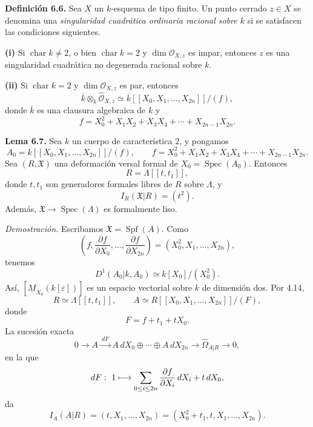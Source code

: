 
\par\medskip
\noindent\textbf{Definición 6.6.}
Sea $X$ un $k$-esquema de tipo finito. Un punto cerrado $z\in X$ se
denomina una \emph{singularidad cuadrática ordinaria racional sobre
$k$} si se satisfacen las condiciones siguientes.

\smallskip
\noindent\textbf{(i)} Si $\operatorname{char}k\neq2$, o bien
$\operatorname{char}k=2$ y $\dim\mathcal O_{X,z}$ es impar, entonces
$z$ es una singularidad cuadrática no degenerada racional sobre $k$.

\smallskip
\noindent\textbf{(ii)} Si $\operatorname{char}k=2$ y
$\dim\mathcal O_{X,z}$ es par, entonces
\[
\overline k\otimes_k\widehat{\mathcal O}_{X,z}
 \simeq
\overline k[[X_0,X_1,\ldots,X_{2n}]]/(f),
\]
donde $\overline k$ es una clausura algebraica de $k$ y
\[
f=X_0^2+X_1X_2+X_3X_4+\cdots+X_{2n-1}X_{2n}.
\]

\par\medskip
\noindent\textbf{Lema 6.7.}
Sea $k$ un cuerpo de característica $2$, y pongamos
\[
A_0=k[[X_0,X_1,\ldots,X_{2n}]]/(f),
\qquad
f=X_0^2+X_1X_2+X_3X_4+\cdots+X_{2n-1}X_{2n}.
\]
Sea $(R,\mathfrak X)$ una deformación versal formal de
$X_0=\operatorname{Spec}(A_0)$. Entonces
\[
R=\Lambda[[t,t_1]],
\]
donde $t,t_1$ son generadores formales libres de $R$ sobre
$\Lambda$, y
\[
I_R(\mathfrak X|R)=(t^2).
\]
Además, $\mathfrak X\longrightarrow\operatorname{Spec}(\Lambda)$ es
formalmente liso.

\smallskip
\noindent\textit{Demostración.}
Escribamos $\mathfrak X=\operatorname{Spf}(A)$. Como
\[
\left(f,\frac{\partial f}{\partial X_0},\ldots,
         \frac{\partial f}{\partial X_{2n}}\right)
=(X_0^2,X_1,\ldots,X_{2n}),
\]
tenemos
\[
D^1(A_0|k,A_0)\simeq k[X_0]/(X_0^2).
\]
Así, $[\underline M_{X_0}(k[\varepsilon])]$ es un espacio vectorial
sobre $k$ de dimensión dos. Por 4.14,
\[
R\simeq\Lambda[[t,t_1]],
\qquad
A\simeq R[[X_0,X_1,\ldots,X_{2n}]]/(F),
\]
donde
\[
F=f+t_1+tX_0.
\]
La sucesión exacta
\[
0\longrightarrow A\xrightarrow{\ dF\ }
A\,dX_0\oplus\cdots\oplus A\,dX_{2n}
\longrightarrow\widehat\Omega_{A|R}\longrightarrow0,
\]
en la que
\[
dF:\ 1\longmapsto
\sum_{0\leq i\leq2n}\frac{\partial f}{\partial X_i}\,dX_i
+t\,dX_0,
\]
da
\[
I_A(A|R)
=(t,X_1,\ldots,X_{2n})
=(X_0^2+t_1,t,X_1,\ldots,X_{2n}).
\]



